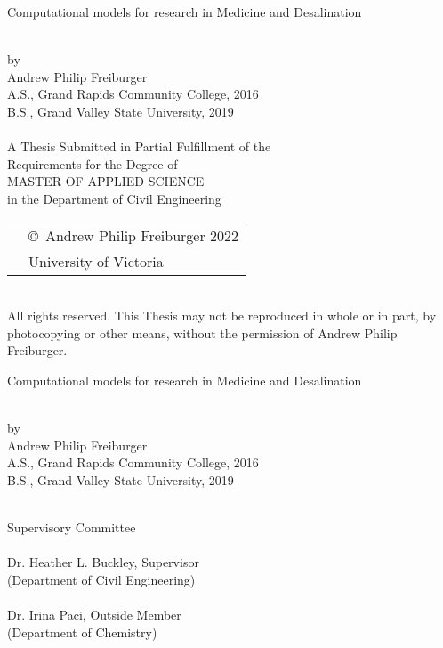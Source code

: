 \newcommand\thesistitle{
    Computational models for research in Medicine and Desalination 
}
\newcommand\nameanddegrees{
    Andrew Philip Freiburger\\
    A.S., Grand Rapids Community College, 2016\\
    B.S., Grand Valley State University, 2019\\
    \tpbreak
}
\newcommand\panel{
    \HRule\\\panelist{Dr. Heather L. Buckley}{Supervisor}{Department of Civil Engineering}
    \HRule\\\panelist{Dr. Irina Paci}{Outside Member}{Department of Chemistry}
}

\newcommand\tpbreak{\\[\baselineskip]}
\newpage
\thispagestyle{empty}

\pagestyle{myheadings}

\pagebreak
{
    \centering
    \thesistitle
    \tpbreak
    
    by
    \tpbreak
    \nameanddegrees
    A Thesis Submitted in Partial Fulfillment of the \\
    Requirements for the Degree of
    \tpbreak
    MASTER OF APPLIED SCIENCE
    \tpbreak
    in the Department of Civil Engineering\\
    \vfill
    \begin{tabular}{cl}
        & \copyright\ Andrew Philip Freiburger 2022\\
        & \phantom{\copyright} University of Victoria
    \end{tabular}
    \tpbreak
    All rights reserved. This Thesis may not be reproduced in whole or in part, by \\
    \hfill photocopying or other means, without the permission of Andrew Philip Freiburger. 
    \hfill
}
\pagebreak

\newpage
{}
{
    \centering
    \thesistitle
    \tpbreak
    by
    \tpbreak
    \nameanddegrees
}
\newcommand\panelist[3]{\noindent #1, #2\\\noindent(#3)\tpbreak}
\vfill
\noindent Supervisory Committee
\tpbreak
\panel
\vfill
\pagebreak

